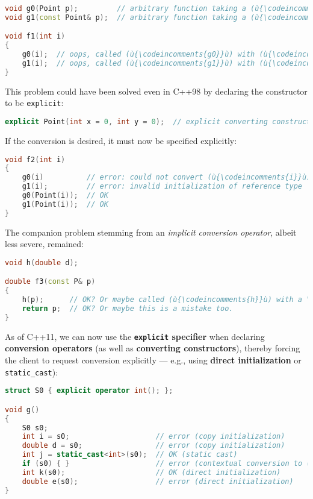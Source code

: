 \begin{lstlisting}[language=C++]
void g0(Point p);         // arbitrary function taking a (ù{\codeincomments{Point}}ù) object by value
void g1(const Point& p);  // arbitrary function taking a (ù{\codeincomments{Point}}ù) by (ù{\codeincomments{const}}ù) reference

void f1(int i)
{
    g0(i);  // oops, called (ù{\codeincomments{g0}}ù) with (ù{\codeincomments{Point(i, 0)}}ù) by mistake
    g1(i);  // oops, called (ù{\codeincomments{g1}}ù) with (ù{\codeincomments{Point(i, 0)}}ù) by mistake
}
\end{lstlisting}

\noindent This problem could have been solved even in C++98 by declaring the
constructor to be \texttt{explicit}:

\begin{lstlisting}[language=C++]
explicit Point(int x = 0, int y = 0);  // explicit converting constructor
\end{lstlisting}

\noindent If the conversion is desired, it must now be specified explicitly:

\begin{lstlisting}[language=C++]
void f2(int i)
{
    g0(i)          // error: could not convert (ù{\codeincomments{i}}ù) from (ù{\codeincomments{int}}ù) to (ù{\codeincomments{Point}}ù)
    g1(i);         // error: invalid initialization of reference type
    g0(Point(i));  // OK
    g1(Point(i));  // OK
}
\end{lstlisting}

\noindent The companion problem stemming from an \emph{implicit conversion
operator}, albeit less severe, remained:

\begin{lstlisting}[language=C++]
void h(double d);

double f3(const P& p)
{
    h(p);      // OK? Or maybe called (ù{\codeincomments{h}}ù) with a "hypotenuse" by mistake
    return p;  // OK? Or maybe this is a mistake too.
}
\end{lstlisting}

\noindent As of C++11, we can now use the \textbf{\texttt{explicit} specifier}
when declaring \textbf{conversion operators} (as well as
\textbf{converting constructors}), thereby forcing the client to request
conversion explicitly --- e.g., using \textbf{direct initialization} or
\texttt{static\_cast}):

\begin{lstlisting}[language=C++]
struct S0 { explicit operator int(); };

void g()
{
    S0 s0;
    int i = s0;                    // error (copy initialization)
    double d = s0;                 // error (copy initialization)
    int j = static_cast<int>(s0);  // OK (static cast)
    if (s0) { }                    // error (contextual conversion to (ù{\codeincomments{bool}}ù))
    int k(s0);                     // OK (direct initialization)
    double e(s0);                  // error (direct initialization)
}
\end{lstlisting}

